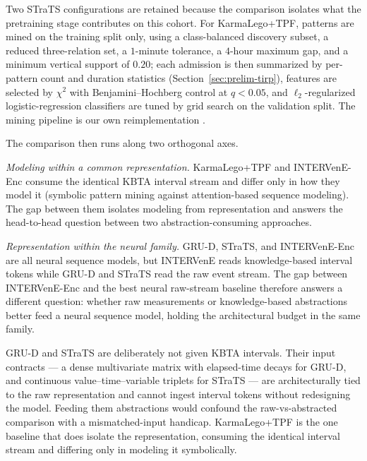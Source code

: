 Two STraTS configurations are retained because the comparison isolates what the pretraining stage contributes on this cohort. For KarmaLego+TPF, patterns are mined on the training split only, using a class-balanced discovery subset, a reduced three-relation set, a $1$-minute tolerance, a $4$-hour maximum gap, and a minimum vertical support of $0.20$; each admission is then summarized by per-pattern count and duration statistics (Section~\ref{sec:prelim-tirp}), features are selected by $\chi^2$ with Benjamini--Hochberg control at $q < 0.05$, and $\ell_2$-regularized logistic-regression classifiers are tuned by grid search on the validation split. The mining pipeline is our own reimplementation \citep{karmalego-github}.

The comparison then runs along two orthogonal axes.

\emph{Modeling within a common representation.} KarmaLego+TPF and INTERVenE-Enc consume the identical KBTA interval stream and differ only in how they model it (symbolic pattern mining against attention-based sequence modeling). The gap between them isolates modeling from representation and answers the head-to-head question between two abstraction-consuming approaches.

\emph{Representation within the neural family.} GRU-D, STraTS, and INTERVenE-Enc are all neural sequence models, but INTERVenE reads knowledge-based interval tokens while GRU-D and STraTS read the raw event stream. The gap between INTERVenE-Enc and the best neural raw-stream baseline therefore answers a different question: whether raw measurements or knowledge-based abstractions better feed a neural sequence model, holding the architectural budget in the same family.

GRU-D and STraTS are deliberately not given KBTA intervals. Their input contracts --- a dense multivariate matrix with elapsed-time decays for GRU-D, and continuous value--time--variable triplets for STraTS --- are architecturally tied to the raw representation and cannot ingest interval tokens without redesigning the model. Feeding them abstractions would confound the raw-vs-abstracted comparison with a mismatched-input handicap. KarmaLego+TPF is the one baseline that does isolate the representation, consuming the identical interval stream and differing only in modeling it symbolically.

